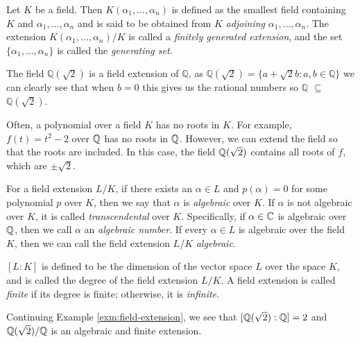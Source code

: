 \begin{definition}
    Let $K$ be a field. Then $K(\alpha_1, \dots, \alpha_n)$ is defined as the smallest field containing $K$ and $\alpha_1, \dots, \alpha_n$ and is said to be obtained from $K$ \textit{adjoining} $\alpha_1, \dots, \alpha_n$. The extension $K(\alpha_1, \dots, \alpha_n) / K$ is called a \textit{finitely generated extension}, and the set $\{\alpha_1, \dots, \alpha_n\}$ is called the \textit{generating set}. 
\end{definition}

\begin{example} \label{exm:field-extension}
The field \(\mathbb{Q}(\sqrt{2})\) is a field extension of \(\mathbb{Q}\), as \(\mathbb{Q}(\sqrt{2}) = \{a + \sqrt{2}b : a,b \in \mathbb{Q}\}\) we can clearly see that when \(b = 0\) this gives us the rational numbers so \(\mathbb{Q}\) $\subseteq$ \(\mathbb{Q}(\sqrt{2})\).
\end{example}

Often, a polynomial over a field $K$ has no roots in $K$. For example, $f(t) = t^2 - 2$ over $\mathbb Q$ has no roots in $\mathbb Q$. However, we can extend the field so that the roots are included. In this case, the field $\mathbb Q(\sqrt 2)$ contains all roots of $f$, which are $\pm \sqrt 2$.

\begin{definition}
For a field extension $L/K$, if there exists an \(\alpha \in L\) and \(p(\alpha)=0\) for some polynomial \(p\) over \(K\), then we say that \(\alpha\) is \textit{algebraic} over $K$. If \(\alpha\) is not algebraic over $K$, it is called \textit{transcendental} over \(K\). Specifically, if $\alpha \in \mathbb C$ is algebraic over $\mathbb Q$, then we call $\alpha$ an \textit{algebraic number}. If every $\alpha \in L$ is algebraic over the field $K$, then we can call the field extension $L/K$ \textit{algebraic}.

\end{definition}


\begin{definition}
    $[L:K]$ is defined to be the dimension of the vector space $L$ over the space $K$, and is called the degree of the field extension $L/K$.
    A field extension is called \textit{finite} if its degree is finite; otherwise, it is \textit{infinite}. 
\end{definition}

\begin{example}
	Continuing Example \ref{exm:field-extension}, we see that $[\mathbb Q(\sqrt 2): \mathbb Q] = 2$ and $\mathbb Q(\sqrt 2) / \mathbb Q$ is an algebraic and finite extension.
\end{example}

